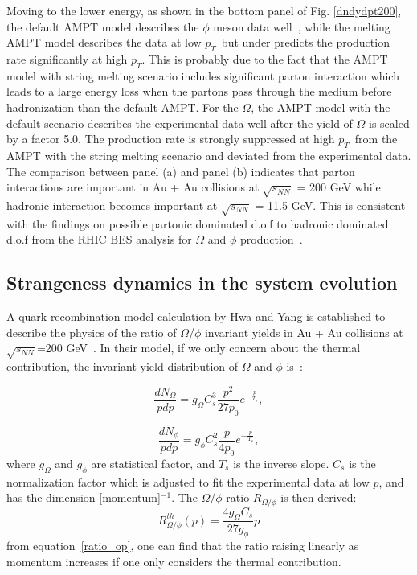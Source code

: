 \documentclass[twocolumn,aps,prc,showpacs,superscriptaddress,preprintnumbers,floatfix,nofootinbib]{revtex4}
\newcommand{ \pt } {${p_{T}}$}
\begin{document}
\begin{CJK*}{GBK}{song}
Moving to the lower energy, as shown in the bottom panel of Fig. \ref{dndydpt200}, the default AMPT model describes the $\phi$ meson  data well~\cite{OmegaphiSTAR}, while the melting AMPT model describes the data at low \pt~but under predicts the production rate significantly at high \pt. This is probably due to the fact that the AMPT model with string melting scenario includes significant parton interaction which leads to a large energy loss when the partons pass through the medium before hadronization than the default AMPT. For the $\Omega$, the AMPT model with the default scenario describes the experimental data well after the yield of $\Omega$ is scaled by a factor 5.0. The production rate is strongly suppressed at high \pt~from the AMPT with the string melting scenario and deviated from the experimental data. The comparison between panel (a) and panel (b) indicates that parton interactions are important in Au + Au collisions at $\sqrt{s_{NN}}$ = 200 GeV while hadronic interaction becomes important at $\sqrt{s_{NN}}$ = 11.5 GeV. This is consistent with the findings on possible partonic dominated d.o.f to hadronic dominated d.o.f  from the RHIC BES  analysis for $\Omega$ and $\phi$ production~\cite{OmegaphiSTAR}.

\subsection{Strangeness dynamics in the system evolution}

A quark recombination model calculation by Hwa and Yang is established to describe the physics of the ratio of $\Omega$/$\phi$ invariant yields in Au + Au collisions at $\sqrt{s_{NN}}$=200 GeV~\cite{ratio}. In their model, if we only concern about the thermal contribution, the invariant yield distribution of $\Omega$ and $\phi$ is~\cite{ratio}:

    \begin{equation}
        \frac{dN_{\Omega}}{pdp}=g_{\Omega}C_{s}^{3}\frac{p^{2}}{27p_{0}}e^{-\frac{p}{T_s}},
        \label{dn_Omega}
    \end{equation}

    \begin{equation}
        \frac{dN_{\phi}}{pdp}=g_{\phi}C_s^{2}\frac{p}{4p_{0}}e^{-\frac{p}{T_s}},
        \label{dn_phi}
    \end{equation}
where $g_{\Omega}$ and $g_{\phi}$ are statistical factor, and $T_s$ is the inverse slope. $C_s$ is the normalization factor which is adjusted to fit the experimental data at low $p$, and has the dimension [momentum]$^{-1}$.
The $\Omega$/$\phi$ ratio $R_{\Omega/\phi}$ is then derived:
     \begin{equation}
        R_{\Omega/\phi}^{th}(p)=\frac{4g_{\Omega}C_{s}}{27g_{\phi}}p
        \label{ratio_op}
    \end{equation}
from equation~\ref{ratio_op}, one can find that the ratio raising linearly as momentum increases if one only considers the thermal contribution.


\end{CJK*}
\end{document}
